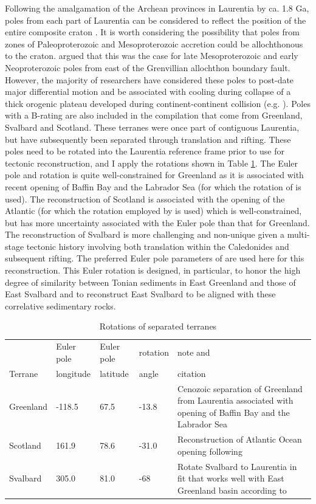 \documentclass[twocolumn, switch]{article} %
\begin{document}
Following the amalgamation of the Archean provinces in Laurentia by ca. 1.8 Ga, poles from each part of Laurentia can be considered to reflect the position of the entire composite craton \citep{Swanson-Hysell2021b}. It is worth considering the possibility that poles from zones of Paleoproterozoic and Mesoproterozoic accretion could be allochthonous to the craton. \cite{Halls2015b} argued that this was the case for late Mesoproterozoic and early Neoproterozoic poles from east of the Grenvillian allochthon boundary fault. However, the majority of researchers have considered these poles to post-date major differential motion and be associated with cooling during collapse of a thick orogenic plateau developed during continent-continent collision (e.g. \citealp{Brown2012a}). Poles with a B-rating are also included in the compilation that come from Greenland, Svalbard and Scotland. These terranes were once part of contiguous Laurentia, but have subsequently been separated through translation and rifting. These poles need to be rotated into the Laurentia reference frame prior to use for tectonic reconstruction, and I apply the rotations shown in Table \ref{tab:terrane_rotations}. The Euler pole and rotation is quite well-constrained for Greenland as it is associated with recent opening of Baffin Bay and the Labrador Sea (for which the rotation of \citealp{Roest1989a} is used). The reconstruction of Scotland is associated with the opening of the Atlantic (for which the rotation employed by \citealp{Torsvik2017a} is used) which is well-constrained, but has more uncertainty associated with the Euler pole than that for Greenland. The reconstruction of Svalbard is more challenging and non-unique given a multi-stage tectonic history involving both translation within the Caledonides and subsequent rifting. The preferred Euler pole parameters of \cite{Maloof2006a} are used here for this reconstruction. This Euler rotation is designed, in particular, to honor the high degree of similarity between Tonian sediments in East Greenland and those of East Svalbard \citep{Maloof2006a, Hoffman2012a} and to reconstruct East Svalbard to be aligned with these correlative sedimentary rocks.

\begin{table}[hbt]
\caption{Rotations of separated terranes}
{\scriptsize
\begin{tabular}{|l|l|l|l|p{1.1 in}|}
  \hline
& Euler pole & Euler pole & rotation & note and \\
Terrane & longitude & latitude & angle & citation \\
\hline
Greenland & -118.5 & 67.5 & -13.8 & Cenozoic separation of Greenland from Laurentia associated with opening of Baffin Bay and the Labrador Sea \citep{Roest1989a} \\
\hline
Scotland & 161.9 & 78.6 & -31.0 & Reconstruction of Atlantic Ocean opening following \cite{Torsvik2017a} \\
\hline
Svalbard & 305.0 & 81.0 & -68 & Rotate Svalbard to Laurentia in fit that works well with East Greenland basin according to \cite{Maloof2006a}\\
\hline
\end{tabular}
}
\label{tab:terrane_rotations}
\end{table}
\end{document}
